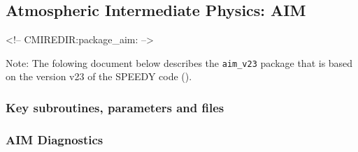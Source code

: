 \subsection{Atmospheric Intermediate Physics: AIM}
\label{sec:pkg:aim}
\begin{rawhtml}
<!-- CMIREDIR:package_aim: -->
\end{rawhtml}

Note:
 The folowing document below describes the \texttt{aim\_v23} package
 that is based on the version v23 of the SPEEDY code (\cite{molteni:03}).

\subsubsection{Key subroutines, parameters and files}
\label{sec:pkg:aim:implementation}

\subsubsection{AIM Diagnostics}
\label{sec:pkg:aim:diagnostics}

